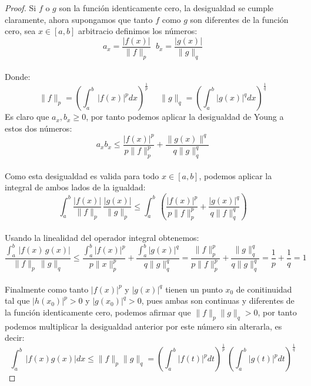 \documentclass[11pt,letterpaper]{article}
\begin{document}
\begin{proof}
    Si $f$ o $g$ son la funci\'on identicamente cero, la desigualdad se cumple claramente, ahora supongamos que tanto $f$ como $g$ son diferentes de la
	funci\'on cero, sea $x\in [a,b]$ arbitracio definimos los n\'umeros:\,\\
	\begin{equation*}
		a_x=\frac{|f(x)|}{\|f\|_p}\,\:\:b_x=\frac{|g(x)|}{\|g\|_q}
	\end{equation*}\,\\
	Donde:\,\\
	\begin{equation*}
		\|f\|_p=\left(\int_{a}^{b}\,|f(x)|^pdx\right)^{\frac{1}{p}}\,\;\:\:\:\:\|g\|_q=\left(\int_{a}^{b}|g(x)|^qdx\right)^{\frac{1}{q}}
	\end{equation*}
	Es claro que $a_x,b_x\geq 0$, por tanto podemos aplicar la desigualdad de Young a estos dos n\'umeros:\,\\
	\begin{equation*}
		a_xb_x\leq \frac{|f(x)|^p}{p\|f\|_p^p}+\frac{\|g(x)\|^q}{q\|g\|_q^q}
	\end{equation*}\,\\
	Como esta desigualdad es valida para todo $x\in [a,b]$, podemos aplicar la integral de ambos lados de la igualdad:\,\\
	\begin{equation*}
		\int_{a}^{b}\frac{|f(x)|}{\|f\|_p}\,\frac{|g(x)|}{\|g\|_p}\leq \int_{a}^{b}\,\left(\frac{|f(x)|^p}{p\|f\|_p^p}+\frac{|g(x)|^q}{q\|f\|_q^q}\right)
	\end{equation*}\,\\
	Usando la linealidad del operador integral obtenemos:\,\\
	\begin{equation*}
	\frac{\int_{a}^{b}\,|f(x)\,g(x)|}{\|f\|_p\,\|g\|_q}\leq\frac{\int_{a}^{b}|f(x)|^p}{p\|x\|_p^p}+\frac{\int_{a}^{b}|g(x)|^q}{q\|g\|_q^q}=\frac{\|f\|_p^p}{p\|f\|_p^p}+\frac{\|g\|_q^q}{q\|g\|_q^q}=\frac{1}{p}+\frac{1}{q}=1
	\end{equation*}\,\\
	Finalmente como tanto $|f(x)|^p$ y $|g(x)|^q$ tienen un punto  $x_0$ de conitinuidad tal que $|h(x_0)|^p>0$ y $|g(x_0)|^q>0$, pues ambas son continuas y diferentes de la funci\'on identicamente cero, podemos afirmar que $\|f\|_p\|g\|_q>0$, por tanto podemos multiplicar la desigualdad anterior por este n\'umero
	sin alterarla, es decir:\,\\
	\begin{equation*}
		\int_{a}^{b}\,|f(x)g(x)|dx\leq\|f\|_p\|g\|_q=\left(\int_{a}^{b}|f(t)|^pdt\right)^{\frac{1}{p}}\,\left(\int_{a}^{b}|g(t)|^pdt\right)^{\frac{1}{q}}
\end{equation*}
\end{proof}
\end{document}
